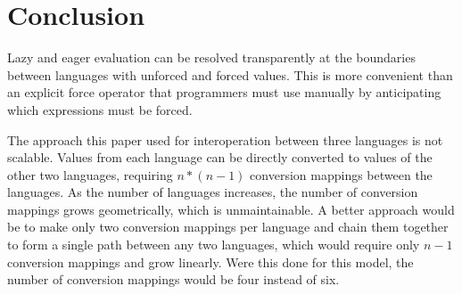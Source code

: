 \section{Conclusion}

Lazy and eager evaluation can be resolved transparently at the boundaries between languages with unforced and forced values. This is more convenient than an explicit force operator that programmers must use manually by anticipating which expressions must be forced.

The approach this paper used for interoperation between three languages is not scalable. Values from each language can be directly converted to values of the other two languages, requiring $n * (n - 1)$ conversion mappings between the languages. As the number of languages increases, the number of conversion mappings grows geometrically, which is unmaintainable. A better approach would be to make only two conversion mappings per language and chain them together to form a single path between any two languages, which would require only $n - 1$ conversion mappings and grow linearly. Were this done for this model, the number of conversion mappings would be four instead of six.